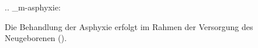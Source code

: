 
.. _m-asphyxie:


Die Behandlung der Asphyxie erfolgt im Rahmen der Versorgung
des Neugeborenen ().